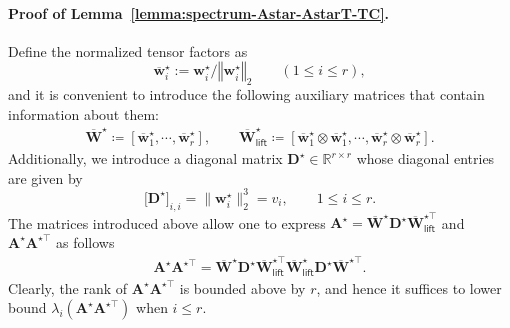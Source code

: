 \paragraph{Proof of Lemma~\ref{lemma:spectrum-Astar-AstarT-TC}.}
%
Define the normalized tensor factors as 
%
\[
	\overline{\bm{w}}_{i}^{\star}:=\bm{w}_{i}^{\star}/\left\Vert \bm{w}_{i}^{\star}\right\Vert _{2}
	\qquad (1\leq i\leq r),
\]
%
and it is convenient to introduce the following auxiliary matrices that contain information about them:
%
\begin{align*}
\overline{\bm{W}}^{\star}\coloneqq \left[\overline{\bm{w}}_{1}^{\star},\cdots,\overline{\bm{w}}_{r}^{\star}\right],\qquad\overline{\bm{W}}_{\mathsf{lift}}^{\star}\coloneqq \left[\overline{\bm{w}}_{1}^{\star}\otimes\overline{\bm{w}}_{1}^{\star},\cdots,\overline{\bm{w}}_{r}^{\star}\otimes\overline{\bm{w}}_{r}^{\star}\right].
\end{align*}
%
Additionally, we introduce a diagonal matrix $\bm{D}^{\star}\in\mathbb{R}^{r\times r}$ whose diagonal entries are given by
%
\[
	\big[ \bm{D}^{\star} \big]_{i,i} =\big\| \bm{w}_{i}^{\star} \big\|_{2}^3 = v_{i},\qquad1\leq i\leq r.
\]
%
The matrices introduced above allow one to express $\bm{A}^{\star} =\overline{\bm{W}}^{\star} \bm{D}^{\star}  \overline{\bm{W}}^{\star\top}_{\mathsf{lift}} $ and $\bm{A}^{\star}\bm{A}^{\star\top}$ as follows
%
\begin{align}
	\label{defn:Astar-Astar-top-expression-TC}
	\bm{A}^{\star}\bm{A}^{\star\top}=\overline{\bm{W}}^{\star} \bm{D}^{\star}  \overline{\bm{W}}^{\star\top}_{\mathsf{lift}} \overline{\bm{W}}^{\star}_{\mathsf{lift}}   \bm{D}^{\star}   \overline{\bm{W}}^{\star\top}.
\end{align}
%
Clearly, the rank of $\bm{A}^{\star}\bm{A}^{\star\top}$ is bounded above by $r$, and hence it suffices to lower bound $\lambda_i(\bm{A}^{\star}\bm{A}^{\star\top})$ when $i\leq r$.


